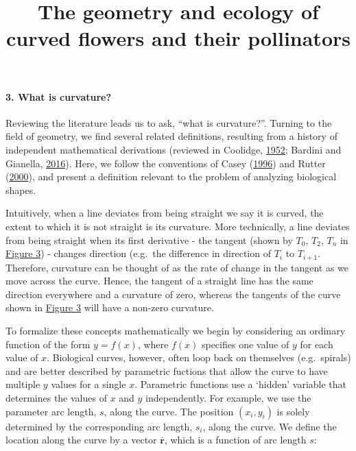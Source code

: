 \documentclass[]{article}
\title{The geometry and ecology of curved flowers and their pollinators}
\author{}
\date{}
\let\oldparagraph\paragraph
\renewcommand{\paragraph}[1]{\oldparagraph{#1}\mbox{}}
\begin{document}
\maketitle

\hypertarget{what-is-curvature}{%
\paragraph{3. What is curvature?}\label{what-is-curvature}}

Reviewing the literature leads us to ask, ``what is curvature?''.
Turning to the field of geometry, we find several related definitions,
resulting from a history of independent mathematical derivations
(reviewed in Coolidge, \protect\hyperlink{ref-coolidge_1952}{1952};
Bardini and Gianella, \protect\hyperlink{ref-bardini_2016}{2016}). Here,
we follow the conventions of Casey
(\protect\hyperlink{ref-casey_1996}{1996}) and Rutter
(\protect\hyperlink{ref-rutter_2000}{2000}), and present a definition
relevant to the problem of analyzing biological shapes.

Intuitively, when a line deviates from being straight we say it is
curved, the extent to which it is not straight is its curvature. More
technically, a line deviates from being straight when its first
derivative - the tangent (shown by \(T_0\), \(T_2\), \(T_n\) in
\href{Figure_3.jpg}{Figure 3}) - changes direction (e.g.~the difference
in direction of \(T_i\) to \(T_{i+1}\). Therefore, curvature can be
thought of as the rate of change in the tangent as we move across the
curve. Hence, the tangent of a straight line has the same direction
everywhere and a curvature of zero, whereas the tangents of the curve
shown in \href{Figure_3.jpg}{Figure 3} will have a non-zero curvature.

To formalize these concepts mathematically we begin by considering an
ordinary function of the form \(y=f(x)\), where \(f(x)\) specifies one
value of \(y\) for each value of \(x\). Biological curves, however,
often loop back on themselves (e.g.~spirals) and are better described by
parametric fuctions that allow the curve to have multiple \(y\) values
for a single \(x\). Parametric functions use a `hidden' variable that
determines the values of \(x\) and \(y\) independently. For example, we
use the parameter arc length, \(s\), along the curve. The position
\((x_i, y_i)\) is solely determined by the corresponding arc length,
\(s_i\), along the curve. We define the location along the curve by a
vector \(\mathbf{\bar{r}}\), which is a function of arc length \(s\):
\end{document}
